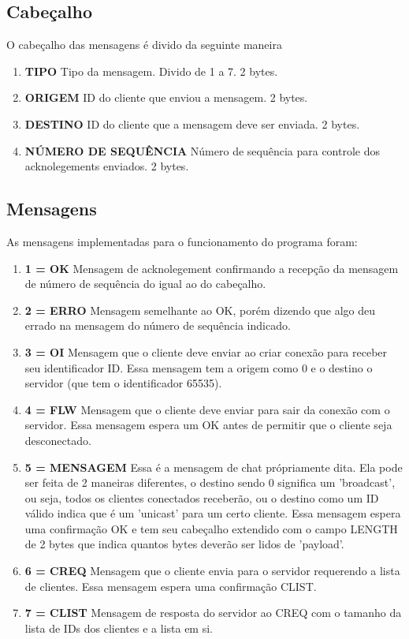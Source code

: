 \documentclass[10pt]{article}
\begin{document}
	\subsection{Cabeçalho}
	O cabeçalho das mensagens é divido da seguinte maneira
	\begin{enumerate}
		\item[]\textbf{TIPO} Tipo da mensagem. Divido de 1 a 7. 2 bytes.
		\item[]\textbf{ORIGEM} ID do cliente que enviou a mensagem. 2 bytes.
		\item[]\textbf{DESTINO} ID do cliente que a mensagem deve ser enviada. 2 bytes.
		\item[]\textbf{NÚMERO DE SEQUÊNCIA} Número de sequência para controle dos acknolegements enviados. 2 bytes.
	\end{enumerate}
	\subsection{Mensagens}
	As mensagens implementadas para o funcionamento do programa foram:
	\begin{enumerate}
		\item[]\textbf{1 = OK} Mensagem de acknolegement confirmando a recepção da mensagem de número de sequência do igual ao do cabeçalho.
		\item[]\textbf{2 = ERRO} Mensagem semelhante ao OK, porém dizendo que algo deu errado na mensagem do número de sequência indicado.
		\item[]\textbf{3 = OI} Mensagem que o cliente deve enviar ao criar conexão para receber seu identificador ID. Essa mensagem tem a origem como 0 e o destino o servidor (que tem o identificador 65535).
		\item[]\textbf{4 = FLW} Mensagem que o cliente deve enviar para sair da conexão com o servidor. Essa mensagem espera um OK antes de permitir que o cliente seja desconectado.
		\item[]\textbf{5 = MENSAGEM} Essa é a mensagem de chat própriamente dita. Ela pode ser feita de 2 maneiras diferentes, o destino sendo 0 significa um 'broadcast', ou seja, todos os clientes conectados receberão, ou o destino como um ID válido indica que é um 'unicast' para um certo cliente. Essa mensagem espera uma confirmação OK e tem seu cabeçalho extendido com o campo LENGTH de 2 bytes que indica quantos bytes deverão ser lidos de 'payload'.
		\item[]\textbf{6 = CREQ} Mensagem que o cliente envia para o servidor requerendo a lista de clientes. Essa mensagem espera uma confirmação CLIST.
		\item[]\textbf{7 = CLIST} Mensagem de resposta do servidor ao CREQ com o tamanho da lista de IDs dos clientes e a lista em si.
	\end{enumerate}	 
\end{document}
